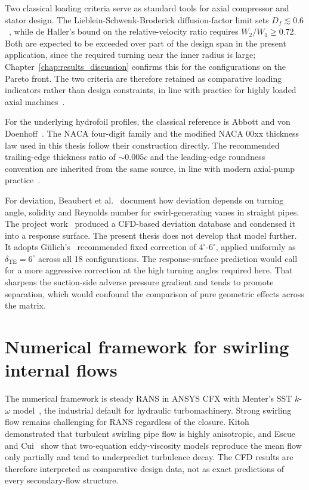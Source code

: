 Two classical loading criteria serve as standard tools for axial compressor and stator design. The Lieblein-Schwenk-Broderick diffusion-factor limit sets $D_f \lesssim 0.6$~\cite{Lieblein1953}, while de Haller's bound on the relative-velocity ratio requires $W_2/W_1 \geq 0.72$. Both are expected to be exceeded over part of the design span in the present application, since the required turning near the inner radius is large; Chapter~\ref{chap:results_discussion} confirms this for the configurations on the Pareto front. The two criteria are therefore retained as comparative loading indicators rather than design constraints, in line with practice for highly loaded axial machines~\cite{Schnoes2018, Leonsen2025}.
 
For the underlying hydrofoil profiles, the classical reference is Abbott and von Doenhoff~\cite{Abbott1959}. The NACA four-digit family and the modified NACA 00xx thickness law used in this thesis follow their construction directly. The recommended trailing-edge thickness ratio of $\sim 0.005c$ and the leading-edge roundness convention are inherited from the same source, in line with modern axial-pump practice~\cite{Gulich2010}.
 
For deviation, Beaubert et al.~\cite{Beaubert2015, Beaubert2016} document how deviation depends on turning angle, solidity and Reynolds number for swirl-generating vanes in straight pipes. The project work~\cite{Leonsen2025} produced a CFD-based deviation database and condensed it into a response surface. The present thesis does not develop that model further. It adopts G\"ulich's~\cite{Gulich2010} recommended fixed correction of $4^\circ$-$6^\circ$, applied uniformly as $\delta_{\mathrm{TE}} = 6^\circ$ across all 18 configurations. The response-surface prediction would call for a more aggressive correction at the high turning angles required here. That sharpens the suction-side adverse pressure gradient and tends to promote separation, which would confound the comparison of pure geometric effects across the matrix.
 
\section{Numerical framework for swirling internal flows}
\label{sec:lit_cfd}
 
The numerical framework is steady RANS in ANSYS CFX with Menter's SST $k$-$\omega$ model~\cite{Menter1994}, the industrial default for hydraulic turbomachinery. Strong swirling flow remains challenging for RANS regardless of the closure. Kitoh~\cite{Kitoh1991} demonstrated that turbulent swirling pipe flow is highly anisotropic, and Escue and Cui~\cite{EscueCui2010} show that two-equation eddy-viscosity models reproduce the mean flow only partially and tend to underpredict turbulence decay. The CFD results are therefore interpreted as comparative design data, not as exact predictions of every secondary-flow structure.
 
